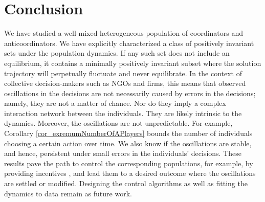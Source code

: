 \documentclass[10 pt,twocolumn,journal]{IEEEtran}
\theoremstyle{plain}
\theoremstyle{definition}
\begin{document}
\section{Conclusion}
We have studied a well-mixed heterogeneous population of coordinators and anticoordinators.
We have explicitly characterized a class of positively invariant sets under the population dynamics.
If any such set does not include an equilibrium, it contains a minimally positively invariant subset where the solution trajectory will perpetually fluctuate and never equilibrate. 
In the context of collective decision-makers such as NGOs and firms, this means that observed oscillations in the decisions are not necessarily caused by errors in the decisions; namely, they are not a matter of chance. 
Nor do they imply a complex interaction network between the individuals. 
They are likely intrinsic to the dynamics.
Moreover, the oscillations are not unpredictable. 
For example, Corollary \ref{cor_exremumNumberOfAPlayers} bounds the number of individuals choosing a certain action over time. 
We also know if the oscillations are stable, and hence, persistent under small errors in the individuals' decisions.
These results pave the path to control the corresponding populations, for example, by providing incentives \cite{riehl2018incentive}, and lead them to a desired outcome where the oscillations are settled or modified.
Designing the control algorithms as well as fitting the dynamics to data remain as future work.






\end{document}
